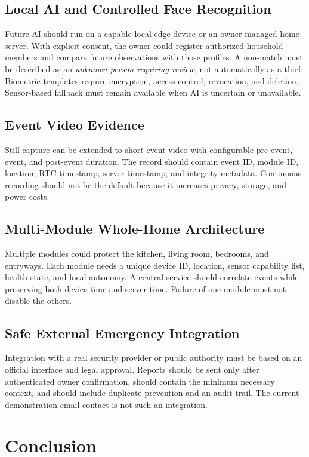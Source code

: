 \documentclass[11pt,a4paper]{report}
\begin{document}
\section{Local AI and Controlled Face Recognition}
Future AI should run on a capable local edge device or an owner-managed home
server. With explicit consent, the owner could register authorized household
members and compare future observations with those profiles. A non-match must
be described as an \emph{unknown person requiring review}, not automatically as
a thief. Biometric templates require encryption, access control, revocation,
and deletion. Sensor-based fallback must remain available when AI is uncertain
or unavailable.

\section{Event Video Evidence}
Still capture can be extended to short event video with configurable
pre-event, event, and post-event duration. The record should contain event ID,
module ID, location, RTC timestamp, server timestamp, and integrity metadata.
Continuous recording should not be the default because it increases privacy,
storage, and power costs.

\section{Multi-Module Whole-Home Architecture}
Multiple modules could protect the kitchen, living room, bedrooms, and
entryways. Each module needs a unique device ID, location, sensor capability
list, health state, and local autonomy. A central service should correlate
events while preserving both device time and server time. Failure of one
module must not disable the others.

\section{Safe External Emergency Integration}
Integration with a real security provider or public authority must be based on
an official interface and legal approval. Reports should be sent only after
authenticated owner confirmation, should contain the minimum necessary
context, and should include duplicate prevention and an audit trail. The
current demonstration email contact is not such an integration.

\chapter{Conclusion}
\end{document}
